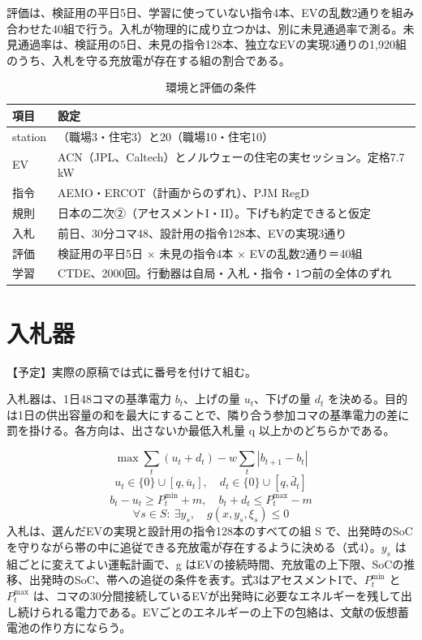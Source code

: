 \documentclass[lettersize,journal]{IEEEtran}
\newlength{\tablecontentwidth}
\newcommand{\draftnote}[1]{{\color{black!65}\small #1\par}}
\begin{document}
評価は、検証用の平日5日、学習に使っていない指令4本、EVの乱数2通りを組み合わせた40組で行う。入札が物理的に成り立つかは、別に未見通過率で測る。未見通過率は、検証用の5日、未見の指令128本、独立なEVの実現3通りの1,920組のうち、入札を守る充放電が存在する組の割合である。

\begin{table}[!t]
\caption{環境と評価の条件}
\label{tab:2}
\centering\footnotesize
\setlength{\tablecontentwidth}{\dimexpr\linewidth-2\tabcolsep\relax}
\begin{tabular}{@{}>{\raggedright\arraybackslash}p{0.1791045\tablecontentwidth}>{\raggedright\arraybackslash}p{0.8208955\tablecontentwidth}@{}}
\toprule
項目 & 設定 \\
\midrule
station & 6（職場3・住宅3）と20（職場10・住宅10） \\
EV & ACN（JPL、Caltech）とノルウェーの住宅の実セッション。定格7.7 kW \\
指令 & AEMO・ERCOT（計画からのずれ）、PJM RegD \\
規則 & 日本の二次②（アセスメントI・II）。下げも約定できると仮定 \\
入札 & 前日、30分コマ48、設計用の指令128本、EVの実現3通り \\
評価 & 検証用の平日5日 × 未見の指令4本 × EVの乱数2通り＝40組 \\
学習 & CTDE、2000回。行動器は自局・入札・指令・1つ前の全体のずれ \\
\bottomrule
\end{tabular}
\end{table}
\section{入札器}
\draftnote{【予定】実際の原稿では式に番号を付けて組む。}
入札器は、1日48コマの基準電力 \(b_t\)、上げの量 \(u_t\)、下げの量 \(d_t\) を決める。目的は1日の供出容量の和を最大にすることで、隣り合う参加コマの基準電力の差に罰を掛ける。各方向は、出さないか最低入札量 q 以上かのどちらかである。

\begin{equation}\max \sum_t (u_t+d_t)-w\sum_t |b_{t+1}-b_t|\label{eq:1}\end{equation}
\begin{equation}u_t\in\{0\}\cup[q,\bar{u}_t],\quad d_t\in\{0\}\cup[q,\bar{d}_t]\label{eq:2}\end{equation}
\begin{equation}b_t-u_t\ge P_t^{\min}+m,\quad b_t+d_t\le P_t^{\max}-m\label{eq:3}\end{equation}
\begin{equation}\forall s\in S:\ \exists y_s,\quad g(x,y_s,\xi_s)\le0\label{eq:4}\end{equation}
入札は、選んだEVの実現と設計用の指令128本のすべての組 S で、出発時のSoCを守りながら帯の中に追従できる充放電が存在するように決める（式4）。\(y_s\) は組ごとに変えてよい運転計画で、g はEVの接続時間、充放電の上下限、SoCの推移、出発時のSoC、帯への追従の条件を表す。式3はアセスメントIで、\(P_t^{\min}\) と \(P_t^{\max}\) は、コマの30分間接続しているEVが出発時に必要なエネルギーを残して出し続けられる電力である。EVごとのエネルギーの上下の包絡は、文献\cite{ref20}の仮想蓄電池の作り方にならう。
\end{document}
